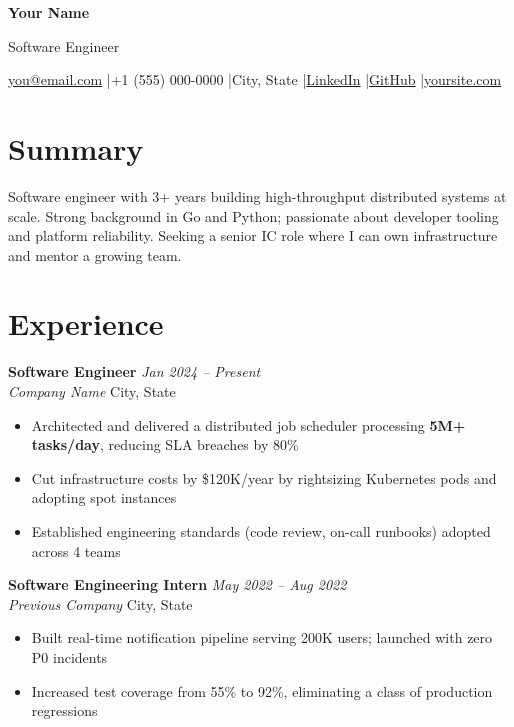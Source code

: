 \documentclass[11pt, a4paper]{article}
\begin{document}
\begin{center}
  {\Huge \textbf{Your Name}}

  \vspace{4pt}
  {\large \color{accent} Software Engineer}

  \vspace{5pt}
  \small
  \href{mailto:you@email.com}{you@email.com}
  \quad|\quad +1 (555) 000-0000
  \quad|\quad City, State
  \quad|\quad \href{https://linkedin.com/in/you}{LinkedIn}
  \quad|\quad \href{https://github.com/you}{GitHub}
  \quad|\quad \href{https://yoursite.com}{yoursite.com}
\end{center}

\section{Summary}
Software engineer with 3+ years building high-throughput distributed systems at scale.
Strong background in Go and Python; passionate about developer tooling and platform reliability.
Seeking a senior IC role where I can own infrastructure and mentor a growing team.

\section{Experience}

\textbf{Software Engineer} \hfill \textit{Jan 2024 -- Present} \\
\textit{\color{accent} Company Name} \hfill {\small City, State}
\begin{itemize}[leftmargin=*, noitemsep, topsep=3pt]
  \item Architected and delivered a distributed job scheduler processing \textbf{5M+ tasks/day}, reducing SLA breaches by 80\%
  \item Cut infrastructure costs by \$120K/year by rightsizing Kubernetes pods and adopting spot instances
  \item Established engineering standards (code review, on-call runbooks) adopted across 4 teams
\end{itemize}

\vspace{5pt}
\textbf{Software Engineering Intern} \hfill \textit{May 2022 -- Aug 2022} \\
\textit{\color{accent} Previous Company} \hfill {\small City, State}
\begin{itemize}[leftmargin=*, noitemsep, topsep=3pt]
  \item Built real-time notification pipeline serving 200K users; launched with zero P0 incidents
  \item Increased test coverage from 55\% to 92\%, eliminating a class of production regressions
\end{itemize}
\end{document}
